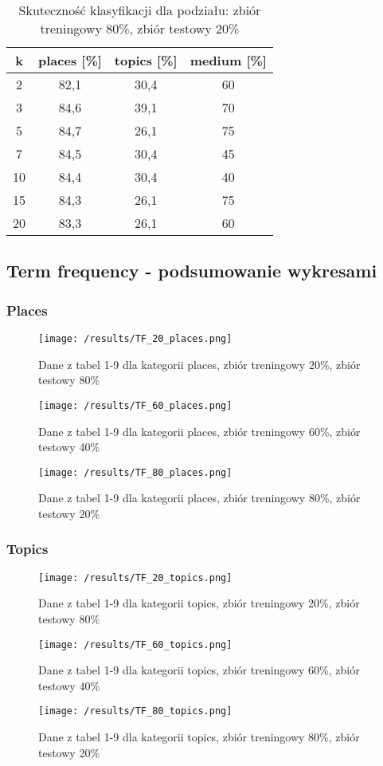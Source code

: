 \documentclass{classrep}
\begin{document}
\begin{table}[H]
	\centering
	\begin{tabular}{c c c c} 
		\hline
		\textbf{k} & \textbf{places [\%]} & \textbf{topics [\%]} &  \textbf{medium [\%]} \\ [0.5ex] 
		\hline
		\hline 
2 & 82,1 & 30,4 & 60 \\ 
3 & 84,6 & 39,1 & 70 \\ 
5 & 84,7 & 26,1 & 75 \\ 
7 & 84,5 & 30,4 & 45 \\ 
10 & 84,4 & 30,4 & 40 \\ 
15 & 84,3 & 26,1 & 75 \\ 
20 & 83,3 & 26,1 & 60 \\ 
		\hline
	\end{tabular}
	\caption{Skuteczność klasyfikacji dla podziału: zbiór treningowy 80\%, zbiór testowy 20\%}
\end{table}


\subsection{Term frequency - podsumowanie wykresami}

\subsubsection{Places}
\begin{figure}[H]
	\centering
	\texttt{[image: /results/TF\_20\_places.png]}
	\caption{Dane z tabel 1-9 dla kategorii places, zbiór treningowy 20\%, zbiór testowy 80\%}
\end{figure}
\begin{figure}[H]
	\centering
	\texttt{[image: /results/TF\_60\_places.png]}
	\caption{Dane z tabel 1-9 dla kategorii places, zbiór treningowy 60\%, zbiór testowy 40\%}
\end{figure}
\begin{figure}[H]
	\centering
	\texttt{[image: /results/TF\_80\_places.png]}
	\caption{Dane z tabel 1-9 dla kategorii places, zbiór treningowy 80\%, zbiór testowy 20\%}
\end{figure}
\subsubsection{Topics}
\begin{figure}[H]
	\centering
	\texttt{[image: /results/TF\_20\_topics.png]}
	\caption{Dane z tabel 1-9 dla kategorii topics, zbiór treningowy 20\%, zbiór testowy 80\%}
\end{figure}
\begin{figure}[H]
	\centering
	\texttt{[image: /results/TF\_60\_topics.png]}
	\caption{Dane z tabel 1-9 dla kategorii topics, zbiór treningowy 60\%, zbiór testowy 40\%}
\end{figure}
\begin{figure}[H]
	\centering
	\texttt{[image: /results/TF\_80\_topics.png]}
	\caption{Dane z tabel 1-9 dla kategorii topics, zbiór treningowy 80\%, zbiór testowy 20\%}
\end{figure}
\end{document}
